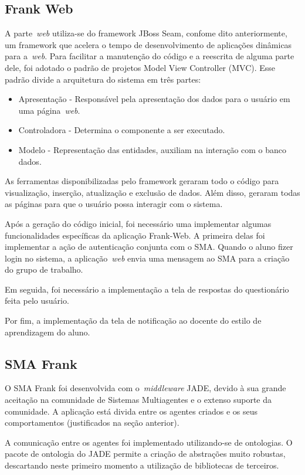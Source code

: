 \subsection{Frank Web}
A parte~\emph{web} utiliza-se do framework JBoss Seam, confome dito anteriormente, um framework que acelera o tempo de desenvolvimento de aplicações dinâmicas para a~\emph{web}. Para facilitar a manutenção do código e a reescrita de alguma parte dele, foi adotado o padrão de projetos
Model View Controller (MVC). Esse padrão divide a arquitetura do sistema em três partes:

\begin{itemize}
	\item Apresentação - Responsável pela apresentação dos dados para o usuário em uma página~\emph{web}.
	\item Controladora - Determina o componente a ser executado.
	\item Modelo - Representação das entidades, auxiliam na interação com o banco dados.
\end{itemize}

As ferramentas disponibilizadas pelo framework geraram todo o código para visualização, inserção, atualização e exclusão de dados. Além disso, geraram todas as páginas para que o usuário possa interagir com o sistema. 

Após a geração do código inicial, foi necessário uma implementar algumas funcionalidades específicas da aplicação Frank-Web. A primeira delas foi implementar a ação de autenticação conjunta com o SMA. Quando o aluno fizer login no sistema, a aplicação~\emph{web} envia uma mensagem ao SMA para a criação do grupo de trabalho.

Em seguida, foi necessário a implementação a tela de respostas do questionário feita pelo usuário.

Por fim, a implementação da tela de notificação ao docente do estilo de aprendizagem do aluno.

\subsection{SMA Frank}

O SMA Frank foi desenvolvida com o~\emph{middleware} JADE, devido à sua grande aceitação na comunidade de Sistemas Multiagentes e o extenso suporte da comunidade. A aplicação está divida entre os agentes criados e os seus comportamentos (justificados na seção anterior).

A comunicação entre os agentes foi implementado utilizando-se de ontologias. O pacote de ontologia do JADE permite a criação de abstrações muito robustas, descartando neste primeiro momento a utilização de bibliotecas de terceiros.

